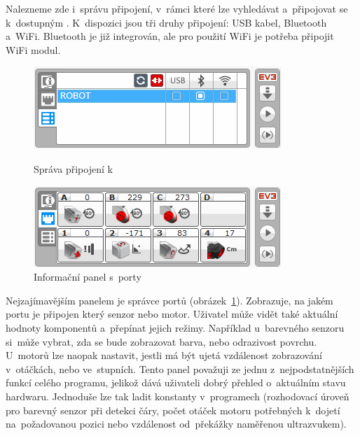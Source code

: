Nalezneme zde i~správu připojení, v~rámci které lze vyhledávat a~připojovat se k~dostupným . 
K~dispozici jsou tři druhy připojení: USB kabel, Bluetooth a~WiFi. Bluetooth je již integrován, ale pro použití WiFi je potřeba připojit WiFi modul.

\begin{figure}[h]
	\begin{minipage}[b]{.48\textwidth}
		\centering
		\includegraphics[width=\textwidth]{images/lego-soft_brick-manager_connected.png}
		\caption{Správa připojení k~}
		\label{fig:lego-soft_brick-manager-connected}
	\end{minipage}
	\hfill
	\begin{minipage}[b]{.48\textwidth}
		\centering
		\includegraphics[width=\textwidth]{images/lego-soft_brick_port-view.png}
		\caption{Informační panel s~porty}
		\label{fig:lego-soft_brick_port-view}
	\end{minipage}
\end{figure}

Nejzajímavějším panelem je správce portů (obrázek~\ref{fig:lego-soft_brick_port-view}). 
Zobrazuje, na jakém portu je připojen který senzor nebo motor. 
Uživatel může vidět také aktuální hodnoty komponentů a~přepínat jejich režimy.    
Například u~barevného senzoru si~může vybrat, zda se bude zobrazovat barva, nebo odrazivost povrchu. U~motorů lze naopak nastavit, jestli má být ujetá vzdálenost zobrazování v~otáčkách, nebo ve~stupních. 
Tento panel považuji ze jednu z~nejpodstatnějších funkcí celého programu, jelikož dává uživateli dobrý přehled o~aktuálním stavu hardwaru. 
Jednoduše lze tak ladit konstanty v~programech (rozhodovací úroveň pro barevný senzor při detekci čáry, počet otáček motoru potřebných k~dojetí na~požadovanou pozici nebo vzdálenost od~překážky naměřenou ultrazvukem). 

